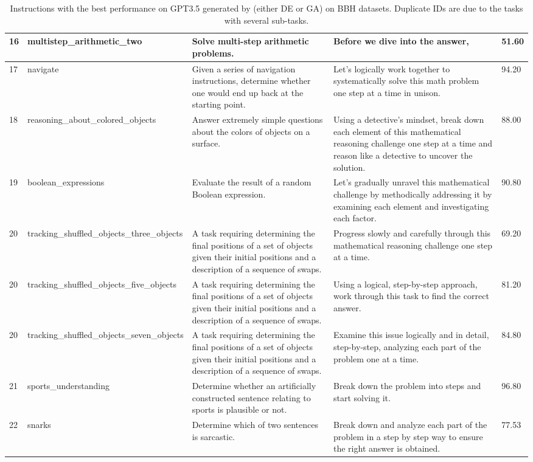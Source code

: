 \begin{table}[t]
{\begin{tabular}{lp{6cm}p{5cm}p{7cm}p{1cm}}
16 & multistep\_arithmetic\_two  &Solve multi-step arithmetic problems. & Before we dive into the answer,	 & 51.60 \\ \midrule
17 & navigate & Given a series of navigation instructions, determine whether one would end up back at the starting point. & Let's logically work together to systematically solve this math problem one step at a time in unison. & 94.20 \\ \midrule
18 & reasoning\_about\_colored\_objects & Answer extremely simple questions about the colors of objects on a surface. & Using a detective's mindset, break down each element of this mathematical reasoning challenge one step at a time and reason like a detective to uncover the solution. 
 & 88.00\\ \midrule
19 & boolean\_expressions &  Evaluate the result of a random Boolean expression. & Let's gradually unravel this mathematical challenge by methodically addressing it by examining each element and investigating each factor. & 90.80 \\
 20 & tracking\_shuffled\_objects\_three\_objects  & A task requiring determining the final positions of a set of objects given their initial positions and a description of a sequence of swaps. & Progress slowly and carefully through this mathematical reasoning challenge one step at a time. & 69.20 \\  \midrule
20 & tracking\_shuffled\_objects\_five\_objects  & A task requiring determining the final positions of a set of objects given their initial positions and a description of a sequence of swaps. & Using a logical, step-by-step approach, work through this task to find the correct answer. & 81.20 \\  \midrule
20 & tracking\_shuffled\_objects\_seven\_objects  & A task requiring determining the final positions of a set of objects given their initial positions and a description of a sequence of swaps. & Examine this issue logically and in detail, step-by-step, analyzing each part of the problem one at a time. & 84.80 \\  \midrule
21 & sports\_understanding & Determine whether an artificially constructed sentence relating to sports is plausible or not. & Break down the problem into steps and start solving it. & 96.80 \\ \midrule
22 & snarks & Determine which of two sentences is sarcastic. &  Break down and analyze each part of the problem in a step by step way to ensure the right answer is obtained. & 77.53 \\

\bottomrule
\end{tabular}}
\caption{Instructions with the best performance on GPT3.5 generated by \textbf{\modelname} (either DE or GA) on BBH datasets. Duplicate IDs are due to the tasks with several sub-tasks.}


\label{tab:bbh-instruction2}
\end{table}